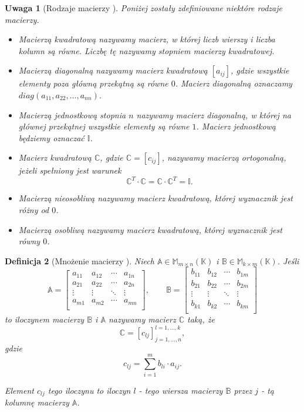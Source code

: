 \documentclass[12pt,a4paper]{report}
\newtheorem{df}{Definicja}[chapter]
\newtheorem{uwaga}[df]{Uwaga}
\newcommand{\setK}{\mathbb{K}}
\begin{document}
\begin{uwaga}[Rodzaje macierzy {\citep[Sec 8.1, Sec 10.4]{alzega}}]
Poniżej zostały zdefiniowane niektóre rodzaje macierzy.
\begin{itemize}
\item Macierzą kwadratową nazywamy macierz, w której liczb wierszy i liczba kolumn są równe. Liczbę tę nazywamy stopniem macierzy kwadratowej.
\item Macierzą diagonalną nazywamy macierz kwadratową $[a_{ij}]$, gdzie wszystkie elementy poza główną przekątną są równe $0$. Macierz diagonalną oznaczamy 
\\$diag(a_{11}, a_{22}, \ldots , a_{nn})$.
\item Macierzą jednostkową stopnia $n$ nazywamy macierz diagonalną, w której na głównej przekątnej wszystkie elementy są równe $1$. Macierz jednostkową będziemy oznaczać $\mathbb{I}$.
\item Macierz kwadratową $\mathbb{C}$, gdzie $\mathbb{C} = [c_{ij}]$, nazywamy macierzą ortogonalną, jeżeli spełniony jest warunek
$$
\mathbb{C}^T \cdot \mathbb{C} = \mathbb{C} \cdot \mathbb{C}^T = \mathbb{I}. 
$$
\item Macierzą nieosobliwą nazywamy macierz kwadratową, której wyznacznik jest różny od $0$.
\item Macierzą osobliwą nazywamy macierz kwadratową, której wyznacznik jest równy $0$.
\end{itemize}
\end{uwaga}

\begin{df}[Mnożenie macierzy {\citep[Sec 9.3 Def 9.13]{alzega}}]
Niech $\mathbb{A} \in \mathbb{M}_{m \times n} (\setK)$ i $\mathbb{B} \in \mathbb{M}_{k \times m} (\setK)$.
Jeśli
$$
\mathbb{A} = \left[
        \begin{array}{cccc}
         a_{11} & a_{12} & \cdots & a_{1n} \\
         a_{21} & a_{22} & \cdots & a_{2n} \\
         \vdots & \vdots & \ddots & \vdots \\
         a_{m1} & a_{m2} & \cdots & a_{mn} \\
         \end{array}
      \right],
      \qquad
\mathbb{B} = \left[
        \begin{array}{cccc}
         b_{11} & b_{12} & \cdots & b_{1m} \\
         b_{21} & b_{22} & \cdots & b_{2m} \\
         \vdots & \vdots & \ddots & \vdots \\
         b_{k1} & b_{k2} & \cdots & b_{km} \\
         \end{array}
      \right]
$$
to iloczynem macierzy $\mathbb{B}$ i $\mathbb{A}$ nazywamy macierz $\mathbb{C}$ taką, że 
$$
\mathbb{C} = [c_{lj}]_{j = 1, \ldots, n}^{l = 1, \ldots , k},
$$
gdzie
$$
c_{lj} = \sum_{i=1}^m b_{li} \cdot a_{ij}.
$$

Element $c_{lj}$ tego iloczynu to iloczyn $l$ - tego wiersza macierzy $\mathbb{B}$ przez $j$ - tą kolumnę macierzy $\mathbb{A}$.
\end{df}
\end{document}

